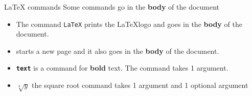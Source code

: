 \begin{frame}[fragile]{LaTeX commands}
    Some commands go in the \textbf{body} of the document
    \newline
    \begin{itemize}
    \item The command \texttt{\LaTeX} prints the \LaTeX logo and goes in the \textbf{body} of the document. \newline

    \item \texttt{\newpage} starts a new page and it also goes in the \textbf{body} of the document.
    \newline

    \item \texttt{\textbf{text}} is a command for \textbf{bold} text. The command takes 1 argument.
    \newline
    \item \texttt{}  \(\sqrt[3]{y}\) the square root command takes 1 argument and 1 optional argument
    \end{itemize}
\end{frame}